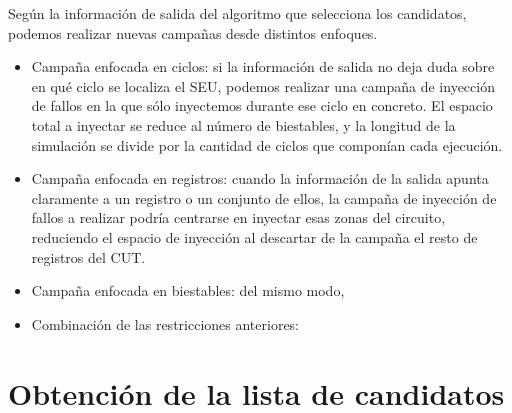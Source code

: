 Según la información de salida del algoritmo que selecciona los candidatos,
podemos realizar nuevas campañas desde distintos enfoques.
\begin{itemize}
    \item Campaña enfocada en ciclos: si la información de salida no deja duda
        sobre en qué ciclo se localiza el \gls{SEU}, podemos realizar una campaña
        de inyección de fallos en la que sólo inyectemos durante ese ciclo en
        concreto. El espacio total a inyectar se reduce al número de biestables, y
        la longitud de la simulación se divide por la cantidad de ciclos que
        componían cada ejecución.
    \item Campaña enfocada en registros: cuando la información de la salida apunta
        claramente a un registro o un conjunto de ellos, la campaña de inyección
        de fallos a realizar podría centrarse en inyectar esas zonas del circuito,
        reduciendo el espacio de inyección al descartar de la campaña el resto de
        registros del \gls{CUT}.
    \item Campaña enfocada en biestables: del mismo modo, 
    \item Combinación de las restricciones anteriores:
\end{itemize}



\section{Obtención de la lista de candidatos}
\label{sec:Candidatos}


